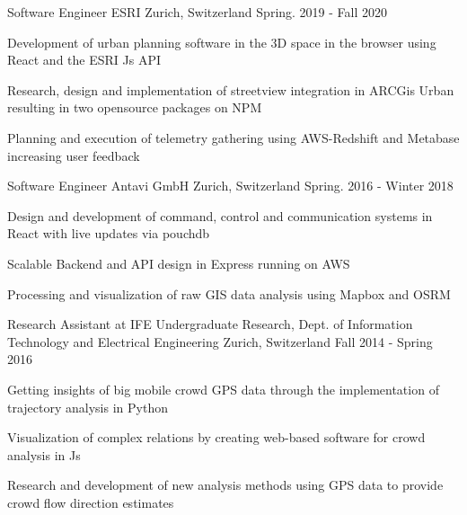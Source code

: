 

\begin{cventries}

  \cventry
    {Software Engineer} %
    {ESRI} %
    {Zurich, Switzerland} %
    {Spring. 2019 - Fall 2020} %
    {
      \begin{cvitems} %
        \item {Development of urban planning software in the 3D space in the browser using React and the ESRI Js API}
        \item {Research, design and implementation of streetview integration in ARCGis Urban resulting in two opensource packages on NPM}
        \item {Planning and execution of telemetry gathering using AWS-Redshift and Metabase increasing user feedback}
      \end{cvitems}
    }

  \cventry
    {Software Engineer} %
    {Antavi GmbH} %
    {Zurich, Switzerland} %
    {Spring. 2016 - Winter 2018} %
    {
      \begin{cvitems} %
        \item {Design and development of command, control and communication systems in React with live updates via pouchdb}
        \item {Scalable Backend and API design in Express running on AWS}
        \item {Processing and visualization of raw GIS data analysis using Mapbox and OSRM}
      \end{cvitems}
    }

  \cventry
    {Research Assistant at IFE} %
    {Undergraduate Research, Dept. of Information Technology and Electrical Engineering} %
    {Zurich, Switzerland} %
    {Fall 2014 - Spring 2016} %
    {
      \begin{cvitems} %
        \item {Getting insights of big mobile crowd GPS data through the implementation of trajectory analysis in Python}
        \item {Visualization of complex relations by creating web-based software for crowd analysis in Js}
        \item {Research and development of new analysis methods using GPS data to provide crowd flow direction estimates}
      \end{cvitems}
    }


\end{cventries}
